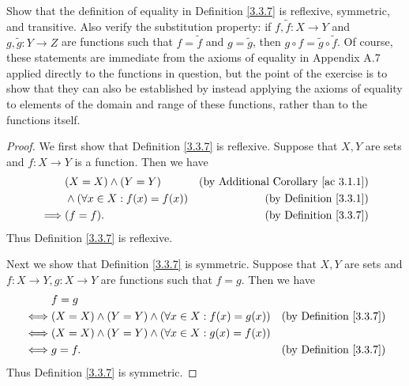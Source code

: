 \begin{exercise}\label{ex 3.3.1}
    Show that the definition of equality in Definition \ref{3.3.7} is reflexive, symmetric, and transitive.
    Also verify the substitution property: if \(f, \tilde{f} : X \to Y\) and \(g, \tilde{g} : Y \to Z\) are functions such that \(f = \tilde{f}\) and \(g = \tilde{g}\), then \(g \circ f = \tilde{g} \circ \tilde{f}\).
    Of course, these statements are immediate from the axioms of equality in Appendix A.7 applied directly to the functions in question, but the point of the exercise is to show that they can also be established by instead applying the axioms of equality to elements of the domain and range of these functions, rather than to the functions itself.
\end{exercise}

\begin{proof}
    We first show that Definition \ref{3.3.7} is reflexive.
    Suppose that \(X, Y\) are sets and \(f : X \to Y\) is a function.
    Then we have
    \begin{align*}
                 & (X = X) \land (Y = Y)                 & \text{(by Additional Corollary \ref{ac 3.1.1})} \\
                 & \land (\forall x \in X : f(x) = f(x)) & \text{(by Definition \ref{3.3.1})}              \\
        \implies & (f = f).                              & \text{(by Definition \ref{3.3.7})}
    \end{align*}
    Thus Definition \ref{3.3.7} is reflexive.

    Next we show that Definition \ref{3.3.7} is symmetric.
    Suppose that \(X, Y\) are sets and \(f : X \to Y, g : X \to Y\) are functions such that \(f = g\).
    Then we have
    \begin{align*}
             & f = g                                                                                            \\
        \iff & (X = X) \land (Y = Y) \land (\forall x \in X : f(x) = g(x)) & \text{(by Definition \ref{3.3.7})} \\
        \iff & (X = X) \land (Y = Y) \land (\forall x \in X : g(x) = f(x))                                      \\
        \iff & g = f.                                                      & \text{(by Definition \ref{3.3.7})}
    \end{align*}
    Thus Definition \ref{3.3.7} is symmetric.


\end{proof}
